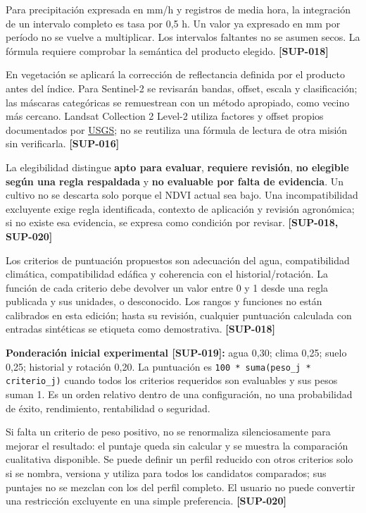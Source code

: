 \documentclass[10pt,a4paper]{article}
\begin{document}
Para precipitación expresada en mm/\allowbreak{}h y registros de media hora, la integración de un intervalo completo es tasa por 0,5 h. Un valor ya expresado en mm por período no se vuelve a multiplicar. Los intervalos faltantes no se asumen secos. La fórmula requiere comprobar la semántica del producto elegido. \textbf{[SUP-018]}


En vegetación se aplicará la corrección de reflectancia definida por el producto antes del índice. Para Sentinel-2 se revisarán bandas, offset, escala y clasificación; las máscaras categóricas se remuestrean con un método apropiado, como vecino más cercano. Landsat Collection 2 Level-2 utiliza factores y offset propios documentados por \href{https://www.usgs.gov/faqs/how-do-i-use-a-scale-factor-landsat-level-2-science-products}{USGS}; no se reutiliza una fórmula de lectura de otra misión sin verificarla. \textbf{[SUP-016]}


La elegibilidad distingue \textbf{apto para evaluar}, \textbf{requiere revisión}, \textbf{no elegible según una regla respaldada} y \textbf{no evaluable por falta de evidencia}. Un cultivo no se descarta solo porque el NDVI actual sea bajo. Una incompatibilidad excluyente exige regla identificada, contexto de aplicación y revisión agronómica; si no existe esa evidencia, se expresa como condición por revisar. \textbf{[SUP-018, SUP-020]}


Los criterios de puntuación propuestos son adecuación del agua, compatibilidad climática, compatibilidad edáfica y coherencia con el historial/\allowbreak{}rotación. La función de cada criterio debe devolver un valor entre 0 y 1 desde una regla publicada y sus unidades, o desconocido. Los rangos y funciones no están calibrados en esta edición; hasta su revisión, cualquier puntuación calculada con entradas sintéticas se etiqueta como demostrativa. \textbf{[SUP-018]}


\textbf{Ponderación inicial experimental [SUP-019]:} agua 0,30; clima 0,25; suelo 0,25; historial y rotación 0,20. La puntuación es \texttt{100 * suma(peso\_\allowbreak{}j * criterio\_\allowbreak{}j)} cuando todos los criterios requeridos son evaluables y sus pesos suman 1. Es un orden relativo dentro de una configuración, no una probabilidad de éxito, rendimiento, rentabilidad o seguridad.


Si falta un criterio de peso positivo, no se renormaliza silenciosamente para mejorar el resultado: el puntaje queda sin calcular y se muestra la comparación cualitativa disponible. Se puede definir un perfil reducido con otros criterios solo si se nombra, versiona y utiliza para todos los candidatos comparados; sus puntajes no se mezclan con los del perfil completo. El usuario no puede convertir una restricción excluyente en una simple preferencia. \textbf{[SUP-020]}
\end{document}
